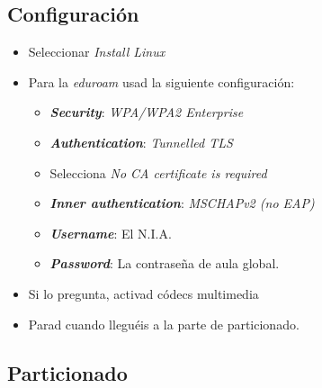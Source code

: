 \documentclass[aspectratio=43]{beamer}
\begin{document}
    \subsection{Configuración}
    \begin{frame}{\secname}{\subsecname}
        \begin{itemize}
            \item Seleccionar \textit{Install Linux}
            \item Para la \textit{eduroam} usad la siguiente configuración:
            \begin{itemize}
                \item \textbf{\textit{Security}}: \textit{WPA/WPA2 Enterprise}
                \item \textbf{\textit{Authentication}}: \textit{Tunnelled TLS}
                \item Selecciona \textit{No CA certificate is required}
                \item \textbf{\textit{Inner authentication}}: \textit{MSCHAPv2 (no EAP)}
                \item \textbf{\textit{Username}}: El N.I.A.
                \item \textbf{\textit{Password}}: La contraseña de aula global.
            \end{itemize}
            \item Si lo pregunta, activad códecs multimedia
            \item Parad cuando lleguéis a la parte de particionado.
        \end{itemize}
    \end{frame}

    \subsection{Particionado}
    \begin{frame}[plain]
    \end{frame}
\end{document}
